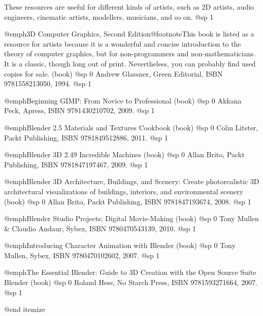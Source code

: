 These resources are useful for different kinds of artists, such as 2D artists, audio engineers, cinematic artists, modellers, musicians, and so on.
@sp 1
\itemize

\item
@emph{3D Computer Graphics, Second Edition}@footnote{This book is listed as a resource for artists because it is a wonderful and concise introduction to the theory of computer graphics, but for non-programmers and non-mathematicians. It is a classic, though long out of print. Nevertheless, you can probably find used copies for sale.} (book)
@sp 0
Andrew Glassner, Green Editorial, ISBN 9781558213050, 1994.
@sp 1

\item
@emph{Beginning GIMP: From Novice to Professional} (book)
@sp 0
Akkana Peck, Apress, ISBN 9781430210702, 2009.
@sp 1

\item
@emph{Blender 2.5 Materials and Textures Cookbook} (book)
@sp 0
Colin Litster, Packt Publishing, ISBN 9781849512886, 2011.
@sp 1

\item
@emph{Blender 3D 2.49 Incredible Machines} (book)
@sp 0
Allan Brito, Packt Publishing, ISBN 9781847197467, 2009.
@sp 1

\item
@emph{Blender 3D Architecture, Buildings, and Scenery: Create photorealistic 3D architectural visualizations of buildings, interiors, and environmental scenery} (book)
@sp 0
Allan Brito, Packt Publishing, ISBN 9781847193674, 2008.
@sp 1

\item
@emph{Blender Studio Projects: Digital Movie-Making} (book)
@sp 0
Tony Mullen & Claudio Andaur, Sybex, ISBN 9780470543139, 2010.
@sp 1

\item
@emph{Introducing Character Animation with Blender} (book)
@sp 0
Tony Mullen, Sybex, ISBN 9780470102602, 2007.
@sp 1

\item
@emph{The Essential Blender: Guide to 3D Creation with the Open Source Suite Blender} (book)
@sp 0
Roland Hess, No Starch Press, ISBN 9781593271664, 2007.
@sp 1

@end itemize

